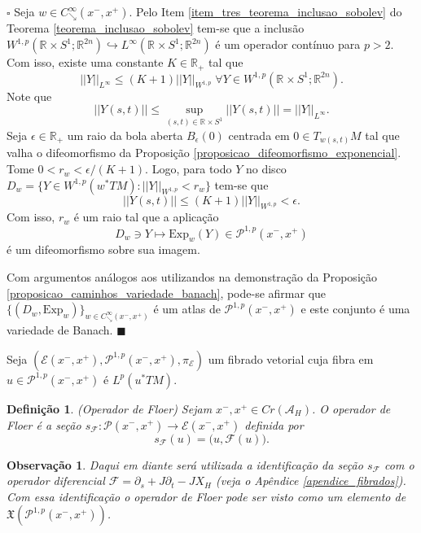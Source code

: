 \documentclass[12pt]{book}
\newtheorem{definicao}[teorema]{Definição}
\newtheorem{observacao}[teorema]{Observação}
\newenvironment{prova}[1]{$\square$ #1}{\hfill$\blacksquare$}
\newcommand{\bigparenteses}[1]{\Big( #1 \Big) }
\newcommand{\caminhosdecaimentoexponencial}[2]{C^{\infty}_{\searrow}(#1, #2)}
\newcommand{\caminhosdecaimentoexponencialpadrao}{\caminhosdecaimentoexponencial{x^{-}}{x^{+}}}
\newcommand{\caminhosexponenciaisconectantesabrev}{\mathcal{P}(x^{-},x^{+})}
\newcommand{\caminhosexponenciaisconectantes}[2]{\mathcal{P}^{1,p}(#1, #2)}
\newcommand{\caminhosexponenciaisconectantespadrao}{\caminhosexponenciaisconectantes{x^{-}}{x^{+}}}
\newcommand{\campohamiltonianoabrev}{X_{H}}
\newcommand{\campossuaves}[1]{\mathfrak{X}(#1)}
\newcommand{\circulo}{S^{1}}
\newcommand{\espacoLp}[1]{L^{p}(#1)}
\newcommand{\espacoLpGeral}[2]{L^{#1}(#2)}
\newcommand{\espacosobolev}[1]{W^{1,p}(#1)}
\newcommand{\espacosobolevcontradominio}[2]{W^{1,p}(#1;#2)}
\newcommand{\espacotangenteponto}[2]{T_{#1}#2}
\newcommand{\Exp}{\text{Exp}}
\newcommand{\fibradocaminhosexponenciais}{\mathcal{E}(x^{-}, x^{+})}
\newcommand{\funcionalH}{\mathcal{A}_{H}}
\newcommand{\operadorFloer}{\mathcal{F}}
\newcommand{\operadorFloerParametro}[1]{\mathcal{F}(#1)}
\newcommand{\norma}[1]{||#1||}
\newcommand{\normaWp}[1]{||#1||_{W^{1,p}}}
\newcommand{\pontoscriticos}[1]{\textit{Cr}(#1)}
\newcommand{\pullbackfibradotangente}[2]{#1^{*}T#2}
\newcommand{\pullbackfibradotangenteM}[1]{\pullbackfibradotangente{#1}{M}}
\newcommand{\retacartesianocirculo}{\real{} \times \circulo}
\newcommand{\real}[1]{\mathbb{R}^{#1}}
\newcommand{\reta}{\real{}}
\begin{document}
	\begin{prova}
		Seja $w \in \caminhosdecaimentoexponencialpadrao$. Pelo Item \ref{item_tres_teorema_inclusao_sobolev} do Teorema \ref{teorema_inclusao_sobolev} tem-se que a inclusão $\espacosobolevcontradominio{\retacartesianocirculo}{\real{2n}} \hookrightarrow \espacoLpGeral{\infty}{\retacartesianocirculo;\real{2n}}$ é um operador contínuo para $p>2$. Com isso, existe uma constante $K\in \reta_{+}$ tal que 
		$$
		\norma{Y}_{L^{\infty}}\leq (K+1)\normaWp{Y}\;\forall Y\in \espacosobolevcontradominio{\retacartesianocirculo}{\real{2n}}.
		$$
		Note que 
		$$
		\norma{Y(s,t)}\leq \sup_{(s,t)\in \retacartesianocirculo}\norma{Y(s,t)} = \norma{Y}_{L^{\infty}}.
		$$
		Seja $\epsilon\in \reta_{+}$ um raio da bola aberta $B_{\epsilon}(0)$ centrada em $0\in \espacotangenteponto{w(s,t)}{M}$ tal que valha o difeomorfismo da Proposição \ref{proposicao_difeomorfismo_exponencial}. Tome  $0<r_{w}< \epsilon/(K+1)$. Logo, para todo $Y$ no disco $D_{w}=\{Y \in \espacosobolev{\pullbackfibradotangenteM{w}}: \normaWp{Y}<r_{w} \}$ tem-se que
		$$
		\norma{Y(s,t)} \leq (K+1)\normaWp{Y} < \epsilon.
		$$
		Com isso, $r_{w}$ é um raio tal que a aplicação 
		$$
		D_{w}\ni Y\mapsto \Exp_{w}(Y) \in \caminhosexponenciaisconectantespadrao
		$$ 
		é um difeomorfismo sobre sua imagem. 
		
		Com argumentos análogos aos utilizandos na demonstração da Proposição \ref{proposicao_caminhos_variedade_banach}, pode-se afirmar que $\{(D_{w}, \Exp_{w})\}_{w\in \caminhosdecaimentoexponencialpadrao} $ é um atlas de $\caminhosexponenciaisconectantespadrao$ e este conjunto é uma variedade de Banach.
	\end{prova}
	
	Seja $(\fibradocaminhosexponenciais, \caminhosexponenciaisconectantespadrao, \pi_{\mathcal{E}})$ um fibrado vetorial cuja fibra em $u \in \caminhosexponenciaisconectantespadrao$ é $\espacoLp{\pullbackfibradotangenteM{u}}$.
	
	\begin{definicao}\label{definicao_operador_floer}
		(Operador de Floer) Sejam $x^{-}, x^{+}\in \pontoscriticos{\funcionalH}$. O operador de Floer é a seção $s_{\operadorFloer}: \caminhosexponenciaisconectantesabrev \to \fibradocaminhosexponenciais$ definida por
		$$
		s_{\operadorFloer}(u)= \bigparenteses{u,\operadorFloerParametro{u}}.
		$$
	\end{definicao}
	
	\begin{observacao}
		Daqui em diante será utilizada a identificação da seção $s_{\operadorFloer}$ com o operador diferencial $\operadorFloer=\partial_{s}+J\partial_{t}-J\campohamiltonianoabrev$ (veja o Apêndice \ref{apendice_fibrados}). Com essa identificação o operador de Floer pode ser visto como um elemento de $\campossuaves{\caminhosexponenciaisconectantespadrao}$.
	\end{observacao}
	
\end{document}
